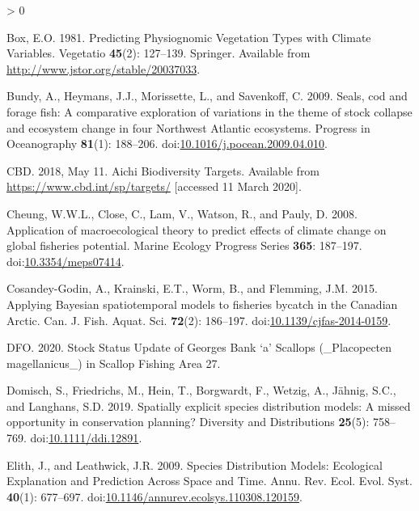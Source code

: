 \documentclass[
]{article}
\newlength{\cslhangindent}
\newenvironment{CSLReferences}[2] %
 {%
  \setlength{\parindent}{0pt}
  \ifodd #1 \everypar{\setlength{\hangindent}{\cslhangindent}}\ignorespaces\fi
  \ifnum #2 > 0
  \setlength{\parskip}{#2\baselineskip}
  \fi
 }%
 {}
\begin{document}
\begin{CSLReferences}{1}{0}
\leavevmode\hypertarget{ref-boxPredictingPhysiognomicVegetation1981}{}%
Box, E.O. 1981. Predicting {Physiognomic Vegetation Types} with {Climate Variables}. Vegetatio \textbf{45}(2): 127--139. {Springer}. Available from \url{http://www.jstor.org/stable/20037033}.

\leavevmode\hypertarget{ref-bundySealsCodForage2009}{}%
Bundy, A., Heymans, J.J., Morissette, L., and Savenkoff, C. 2009. Seals, cod and forage fish: {A} comparative exploration of variations in the theme of stock collapse and ecosystem change in four {Northwest Atlantic} ecosystems. Progress in Oceanography \textbf{81}(1): 188--206. doi:\href{https://doi.org/10.1016/j.pocean.2009.04.010}{10.1016/j.pocean.2009.04.010}.

\leavevmode\hypertarget{ref-cbdAichiBiodiversityTargets2018}{}%
CBD. 2018, May 11. Aichi {Biodiversity Targets}. Available from \url{https://www.cbd.int/sp/targets/} {[}accessed 11 March 2020{]}.

\leavevmode\hypertarget{ref-cheungApplicationMacroecologicalTheory2008}{}%
Cheung, W.W.L., Close, C., Lam, V., Watson, R., and Pauly, D. 2008. Application of macroecological theory to predict effects of climate change on global fisheries potential. Marine Ecology Progress Series \textbf{365}: 187--197. doi:\href{https://doi.org/10.3354/meps07414}{10.3354/meps07414}.

\leavevmode\hypertarget{ref-cosandey-godinApplyingBayesianSpatiotemporal2015}{}%
Cosandey-Godin, A., Krainski, E.T., Worm, B., and Flemming, J.M. 2015. Applying {Bayesian} spatiotemporal models to fisheries bycatch in the {Canadian Arctic}. Can. J. Fish. Aquat. Sci. \textbf{72}(2): 186--197. doi:\href{https://doi.org/10.1139/cjfas-2014-0159}{10.1139/cjfas-2014-0159}.

\leavevmode\hypertarget{ref-dfoStockStatusUpdate2019a}{}%
DFO. 2020. Stock {Status Update} of {Georges Bank} {`a'} {Scallops} (\_{Placopecten} magellanicus\_) in {Scallop Fishing Area} 27.

\leavevmode\hypertarget{ref-domischSpatiallyExplicitSpecies2019}{}%
Domisch, S., Friedrichs, M., Hein, T., Borgwardt, F., Wetzig, A., Jähnig, S.C., and Langhans, S.D. 2019. Spatially explicit species distribution models: {A} missed opportunity in conservation planning? Diversity and Distributions \textbf{25}(5): 758--769. doi:\href{https://doi.org/10.1111/ddi.12891}{10.1111/ddi.12891}.

\leavevmode\hypertarget{ref-elithSpeciesDistributionModels2009}{}%
Elith, J., and Leathwick, J.R. 2009. Species {Distribution Models}: {Ecological Explanation} and {Prediction Across Space} and {Time}. Annu. Rev. Ecol. Evol. Syst. \textbf{40}(1): 677--697. doi:\href{https://doi.org/10.1146/annurev.ecolsys.110308.120159}{10.1146/annurev.ecolsys.110308.120159}.


\end{CSLReferences}
\end{document}
